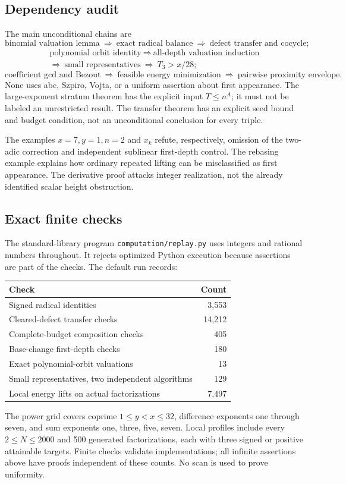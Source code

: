 \documentclass[11pt]{article}
\theoremstyle{definition}\newtheorem{definition}[theorem]{Definition}
\theoremstyle{remark}\newtheorem{remark}[theorem]{Remark}
\begin{document}
\subsection{Dependency audit}
The main unconditional chains are
\[
\text{binomial valuation lemma}
\ \Longrightarrow\ \text{exact radical balance}
\ \Longrightarrow\ \text{defect transfer and cocycle};
\]
\[
\begin{gathered}
\text{polynomial orbit identity}
\ \Longrightarrow\ \text{all-depth valuation induction}\\
\Longrightarrow\ \text{small representatives}
\ \Longrightarrow\ T_3>x/28;
\end{gathered}
\]
\[
\text{coefficient gcd and Bezout}
\ \Longrightarrow\ \text{feasible energy minimization}
\ \Longrightarrow\ \text{pairwise proximity envelope}.
\]
None uses abc, Szpiro, Vojta, or a uniform assertion about first appearance.
The large-exponent stratum theorem has the explicit input $T\le n^A$;
it must not be labeled an unrestricted result. The transfer theorem has an
explicit seed bound and budget condition, not an unconditional conclusion
for every triple.

The examples $x=7,y=1,n=2$ and $x_k$ refute, respectively, omission of the
two-adic correction and independent sublinear first-depth control. The
rebasing example explains how ordinary repeated lifting can be misclassified
as first appearance. The derivative proof attacks integer realization,
not the already identified scalar height obstruction.

\subsection{Exact finite checks}
The standard-library program \texttt{computation/replay.py} uses integers
and rational numbers throughout. It rejects optimized Python execution
because assertions are part of the checks. The default run records:
\begin{center}
\begin{tabular}{lr}\toprule
Check & Count\\\midrule
Signed radical identities & 3,553\\
Cleared-defect transfer checks & 14,212\\
Complete-budget composition checks & 405\\
Base-change first-depth checks & 180\\
Exact polynomial-orbit valuations & 13\\
Small representatives, two independent algorithms & 129\\
Local energy lifts on actual factorizations & 7,497\\\bottomrule
\end{tabular}
\end{center}
The power grid covers coprime $1\le y<x\le32$, difference exponents one
through seven, and sum exponents one, three, five, seven. Local profiles
include every $2\le N\le2000$ and 500 generated factorizations, each with
three signed or positive attainable targets. Finite checks validate
implementations; all infinite assertions above have proofs independent
of these counts. No scan is used to prove uniformity.
\end{document}
